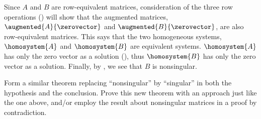 Since $A$ and $B$ are row-equivalent matrices, consideration of the three row operations () will show that the augmented matrices, $\augmented{A}{\zerovector}$ and $\augmented{B}{\zerovector}$, are also row-equivalent matrices.  This says that the two homogeneous systems, $\homosystem{A}$ and $\homosystem{B}$ are equivalent systems.  $\homosystem{A}$ has only the zero vector as a solution (), thus $\homosystem{B}$ has only the zero vector as a solution.  Finally, by , we see that $B$ is nonsingular.\par
%
Form a similar theorem replacing ``nonsingular'' by ``singular'' in both the hypothesis and the conclusion. Prove this new theorem with an approach just like the one above, and/or employ the result about nonsingular matrices in a proof by contradiction.
